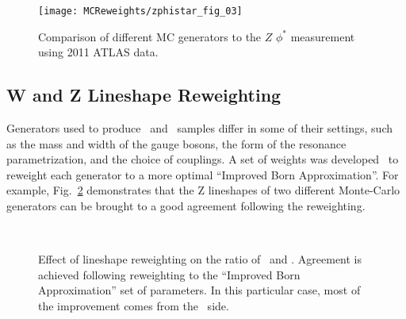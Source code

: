 \begin{figure}[htb]
  \begin{center}
    \texttt{[image: MCReweights/zphistar\_fig\_03]}
    \caption{Comparison of different MC generators to the $Z$ $\phi^*$ measurement using 2011 ATLAS data.}
    \label{fig:zphistar_mcplot}
  \end{center}
\end{figure}

\subsection{W and Z Lineshape Reweighting }
Generators used to produce \Wln\ and \Zgll\ samples differ in some of their settings, such as the mass and width of the gauge bosons, the form of the resonance parametrization, and the choice of couplings. A set of weights was developed~\cite{iba_maarten_vicini} to reweight each generator to a more optimal ``Improved Born Approximation''. For example, Fig.~\ref{fig:bosonm_reweight} demonstrates that the Z lineshapes of two different Monte-Carlo generators can be brought to a good agreement following the reweighting.

\begin{figure}[htb]
  \begin{center}
     \\
    \caption{Effect of lineshape reweighting on the ratio of \Pythia\ and \Powheg\Pythia. Agreement is achieved following reweighting to the ``Improved Born Approximation'' set of parameters. In this particular case, most of the improvement comes from the \Powheg\Pythia\ side.}
    \label{fig:bosonm_reweight}
  \end{center}
\end{figure}


